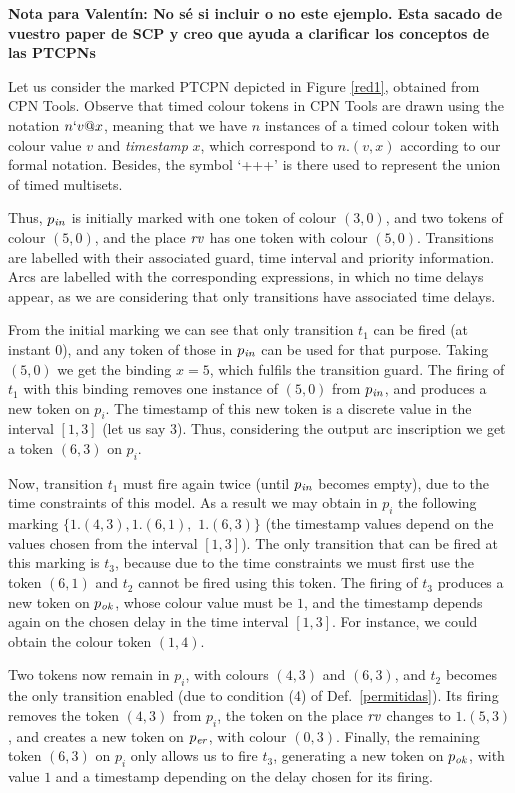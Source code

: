 {\bf Nota para Valentín: No sé si incluir o no este ejemplo. Esta sacado de vuestro paper de SCP y creo que ayuda a clarificar los conceptos de las PTCPNs}
\begin{example} Let us consider the marked PTCPN depicted in Figure \ref{red1}, 
obtained from CPN Tools. 
% 
Observe that timed colour tokens in CPN Tools are drawn
using the notation $n`v@x$,
meaning that we have $n$ instances of a timed colour token 
with colour value $v$ and {\em timestamp} $x$, which correspond to $n.(v,x)$
according to our formal notation. Besides, the symbol `+++'
is there used to represent the union of timed
multisets. 

Thus, $p_{\it in}$ is initially marked with one token
of colour $(3,0)$, and two tokens of colour $(5,0)$,
and the place ${\it rv}$ has one token with colour
$(5,0)$.  Transitions are labelled
with their associated guard, time interval and priority
information. 
Arcs are labelled with the corresponding expressions,
in which no time delays appear, as we are considering
that only transitions have associated time delays.

From the initial marking we can see that
only transition $t_1$ can be fired (at instant $0$), and
any token of those in $p_{\it in}$ can be used for
that purpose.  Taking $(5,0)$ we get the binding $x=5$,
which fulfils the transition guard.
The firing of $t_1$ with this binding removes
one instance of $(5,0)$ from $p_{\it in}$,
and produces a new token on $p_i$.
The timestamp of this new token is a discrete value
in the interval $[1,3]$ (let us say $3$).
Thus, considering the output
arc inscription we get a token $(6,3)$  on $p_i$.

Now, transition $t_1$ must fire again twice (until $p_{\it in}$ 
becomes empty), due to the time constraints of this model. 
As a result we may obtain in $p_i$ the following marking
$\{1.(4,3), 1.(6,1),$
$ 1.(6,3)\}$ (the timestamp values depend on the values
chosen from the interval $[1,3]$).
% 
The only transition that can be fired at this marking
is $t_3$, because due to the time constraints 
we must first use the token $(6,1)$
and $t_2$ cannot be fired using this token.
The firing of $t_3$ produces a new token on $p_{\it ok}$,
whose colour value must be $1$, and the timestamp
depends again on the chosen delay in the time interval
$[1,3]$. For instance, we could obtain the 
colour token $(1,4)$. 

Two tokens now remain in $p_i$, with colours  $(4,3)$ and 
$(6,3)$, and $t_2$ becomes the only transition
enabled (due to condition (4) of Def.\ \ref{permitidas}).
Its firing removes the token $(4,3)$ from $p_i$,
the token on the place ${\it rv}$ changes to $1.(5,3)$,  
and creates a new token on $p_{\it er}$, with colour $(0,3)$. 
%
% 
Finally, the remaining token $(6,3)$ on $p_i$ 
only allows us to fire $t_3$, generating a new token
on $p_{\it ok}$, with value $1$ and a timestamp
depending on the delay chosen for its firing.
\end{example}


